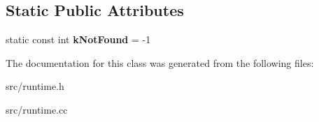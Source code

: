 \subsection*{Static Public Attributes}
\begin{DoxyCompactItemize}
\item 
\hypertarget{classv8_1_1internal_1_1_runtime_a15cd342f4d259e6ca8751f01bf7915be}{}static const int {\bfseries k\+Not\+Found} = -\/1\label{classv8_1_1internal_1_1_runtime_a15cd342f4d259e6ca8751f01bf7915be}

\end{DoxyCompactItemize}


The documentation for this class was generated from the following files\+:\begin{DoxyCompactItemize}
\item 
src/runtime.\+h\item 
src/runtime.\+cc\end{DoxyCompactItemize}
